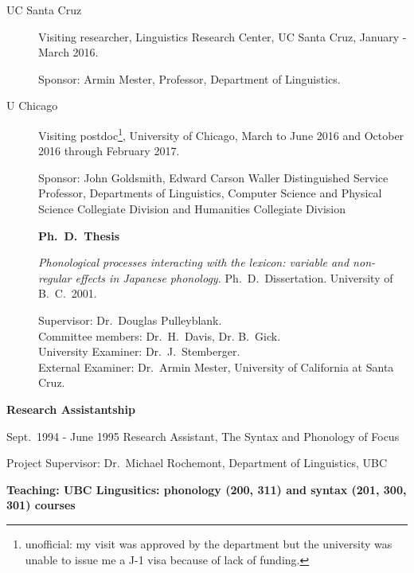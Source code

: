 \documentclass[11pt]{article}
\newcommand{\ii}{\item}
\begin{document}
\begin{description}
\ii[UC Santa Cruz] Visiting researcher, Linguistics Research Center, UC Santa Cruz,
January - March 2016.

Sponsor: Armin Mester, Professor, Department of Linguistics.

\ii[U Chicago] Visiting postdoc\footnote{unofficial: my visit was approved by the department but the university was unable to issue me a J-1 visa because of lack of funding.},
University of Chicago, March to June 2016 and October 2016 through February 2017.

Sponsor: John Goldsmith, Edward Carson Waller Distinguished Service Professor, 
Departments of Linguistics, Computer Science and Physical Science Collegiate Division and Humanities Collegiate Division

\hspace{-1cm} \textbf{Ph.\ D.\ Thesis}

\medskip

\noindent\textit{Phonological processes interacting with the lexicon: variable and non-regular effects in
Japanese phonology.} Ph.\ D.\ Dissertation. University of B.\ C.\ 2001. 

\medskip

\noindent Supervisor: Dr.\ Douglas Pulleyblank. \\
Committee members: Dr.\ H.\ Davis, Dr. B.\ Gick. \\ 
University Examiner: Dr.\ J.\ Stemberger. \\
External Examiner: Dr.\ Armin Mester, University of California at Santa Cruz.

\end{description}

\noindent\textbf{Research Assistantship}

\medskip

Sept.\ 1994 - June 1995   Research Assistant, The Syntax and Phonology of Focus

Project Supervisor: Dr.\ Michael Rochemont, Department of Linguistics, UBC

\bigskip

\noindent\textbf{Teaching: UBC Lingusitics: phonology (200, 311) and syntax (201, 300, 301) courses}
\end{document}
